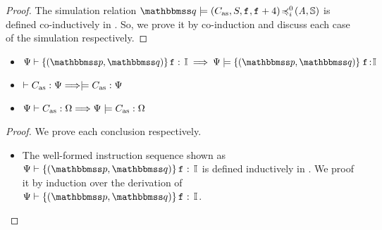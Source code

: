 {\begin{proof}
    The simulation relation $\simFunctionSt{\relastQ}{(\asmimp, \state, \lab{}, \lab{}+4)}
    {i}{0}{(\primcom, \hpstate)}$ is defined co-inductively 
    in \Def{\ref{def:sim-imp-prim-state}}. So, we prove 
    it by co-induction and discuss each case of the simulation
    respectively. 
\end{proof}

\begin{lemma}
    \em
    \label{lemma:Logic Ensures Simulation} \mbox{}
    \begin{itemize}
        \item $\wdcblk{\Cspec}{\relastP}{\relastQ}{\lab{}}{\cblk}
            \implies 
            \semwfseqrel{\Cspec}{\relastP}{\relastQ}{\cblk}$
        \item $\vdash {C_{\text{as}}} : {\Psi} \Longrightarrow 
            \models C_{\text{as}}:\Psi$ 
        \item ${\Psi} \vdash {C_{\text{as}}} : {\Omega} \Longrightarrow
            {\Psi} \models {C_{\text{as}}} : {\Omega}$
    \end{itemize}
\end{lemma}
\begin{proof}
    We prove each conclusion respectively. 
    \begin{itemize}
        \item The well-formed instruction sequence shown as 
            $\wdcblk{\Cspec}{\relastP}{\relastQ}{\lab{}}{\cblk}$ 
            is defined inductively in 
            \Fig{\ref{fig:Selected Inference Rules for Refinement Verification}}. 
            We proof it by induction over the derivation of 
            $\wdcblk{\Cspec}{\relastP}{\relastQ}{\lab{}}{\cblk}$.


\end{itemize}
\end{proof}}
